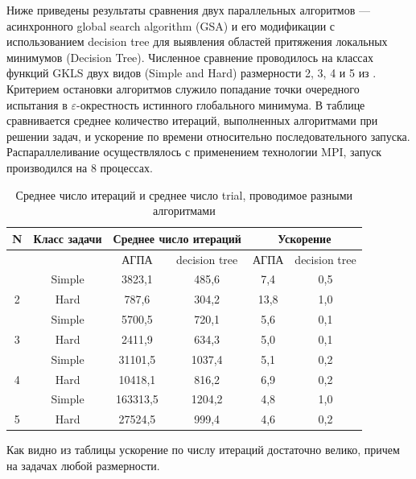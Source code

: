 \documentclass{svproc}
\begin{document}
Ниже приведены результаты сравнения двух параллельных алгоритмов --- асинхронного global search algorithm (GSA) и его модификации с использованием decision tree для выявления областей притяжения локальных минимумов (Decision Tree). Численное сравнение проводилось на классах функций GKLS двух видов (Simple and Hard) размерности 2, 3, 4 и 5 из \cite{fio_bib19}. Критерием остановки алгоритмов служило попадание точки очередного испытания в $\varepsilon$-окрестность истинного глобального минимума. 
В таблице сравнивается среднее количество итераций, выполненных алгоритмами при решении задач, и ускорение по времени относительно последовательного запуска. Распараллеливание  осуществлялось с применением технологии MPI, запуск производился на 8 процессах.


\begin{table}[h!]
	\caption{Среднее число итераций и среднее число trial, проводимое разными алгоритмами}
	\label{tab:2}
	\centering
	\begin{tabular}{|c|c|c|c|c|c|}
		\hline
		
		N & Класс задачи & \multicolumn{2}{c|}{Среднее число итераций} & \multicolumn{2}{c|}{Ускорение} \\ \hline
		& ~ & АГПА & decision tree & АГПА & decision tree \\ \hline
		& Simple & 3823,1   & 485,6  & 7,4   & 0,5 \\ \hline
		2  & Hard & 787,6    & 304,2  & 13,8  & 1,0 \\ \hline
		& Simple & 5700,5   & 720,1  & 5,6   & 0,1 \\ \hline
		3  & Hard & 2411,9   & 634,3  & 5,0   & 0,1 \\ \hline
		& Simple & 31101,5  & 1037,4 & 5,1   & 0,2 \\ \hline
		4  & Hard & 10418,1  & 816,2  & 6,9   & 0,2 \\ \hline
		& Simple & 163313,5 & 1204,2 & 4,8   & 1,0 \\ \hline
		5  & Hard & 27524,5  & 999,4  & 4,6   & 0,2 \\ \hline
	\end{tabular}
\end{table}

Как видно из таблицы ускорение по числу итераций достаточно велико, причем на задачах любой размерности. 

\end{document}
